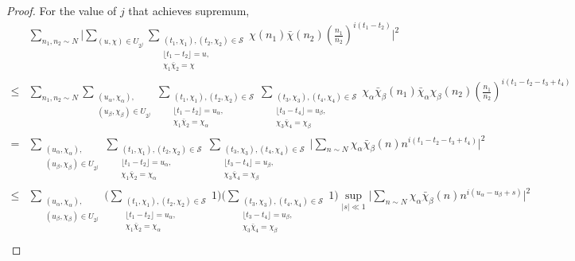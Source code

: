 \begin{proof}
For the value of $j$ that achieves supremum, \begin{align*}
    &\sum_{n_1,n_2\sim N} \Bigg|
   \sum_{(u,\chi)\in U_{2^j}}\sum_{\substack{(t_1,\chi_1),(t_2,\chi_2)\in \mathcal{S}\\ \lfloor t_1-t_2 \rfloor = u,\\ \chi_1\bar\chi_2=\chi}} 
  \chi(n_1)\bar{\chi}(n_2) \left(\frac{n_1}{n_2}\right)^{i(t_1-t_2)}\Bigg|^2\\
  \leq &\sum_{n_1,n_2\sim N} 
  \sum_{\substack{(u_{\alpha},\chi_{\alpha}),\\(u_{\beta},\chi_{\beta})\in U_{2^j}}}\sum_{\substack{(t_1,\chi_1),(t_2,\chi_2)\in \mathcal{S}\\ \lfloor t_1-t_2 \rfloor = u_{\alpha},\\ \chi_1\bar\chi_2=\chi_{\alpha}}} \sum_{\substack{(t_3,\chi_3),(t_4,\chi_4)\in \mathcal{S}\\ \lfloor t_3-t_4 \rfloor = u_{\beta},\\ \chi_3\bar\chi_4=\chi_{\beta}}} 
 \chi_\alpha\bar\chi_\beta(n_1)\bar{\chi}_\alpha\chi_\beta(n_2) \left(\frac{n_1}{n_2}\right)^{i(t_1-t_2-t_3+t_4)}\\
 =&\sum_{\substack{(u_{\alpha},\chi_{\alpha}),\\(u_{\beta},\chi_{\beta})\in U_{2^j}}}\sum_{\substack{(t_1,\chi_1),(t_2,\chi_2)\in \mathcal{S}\\ \lfloor t_1-t_2 \rfloor = u_{\alpha},\\ \chi_1\bar\chi_2=\chi_{\alpha}}} \sum_{\substack{(t_3,\chi_3),(t_4,\chi_4)\in \mathcal{S}\\ \lfloor t_3-t_4 \rfloor = u_{\beta},\\ \chi_3\bar\chi_4=\chi_{\beta}}}\Big| \sum_{n\sim N}  \chi_\alpha\bar\chi_\beta(n){n}^{i(t_1-t_2-t_3+t_4)}\Big|^2\\
 \leq & \sum_{\substack{(u_{\alpha},\chi_{\alpha}),\\(u_{\beta},\chi_{\beta})\in U_{2^j}}}
 \Bigg(\sum_{\substack{(t_1,\chi_1),(t_2,\chi_2)\in \mathcal{S}\\ \lfloor t_1-t_2 \rfloor = u_{\alpha},\\ \chi_1\bar\chi_2=\chi_{\alpha}}} 1\Bigg)
 \Bigg(\sum_{\substack{(t_3,\chi_3),(t_4,\chi_4)\in \mathcal{S}\\ \lfloor t_3-t_4 \rfloor = u_{\beta},\\ \chi_3\bar\chi_4=\chi_{\beta}}} 1\Bigg)
 \sup_{|s|\ll 1}\Big| \sum_{n\sim N}  \chi_\alpha\bar\chi_\beta(n){n}^{i(u_\alpha - u_\beta + s)}\Big|^2\\

\end{align*}
\end{proof}
